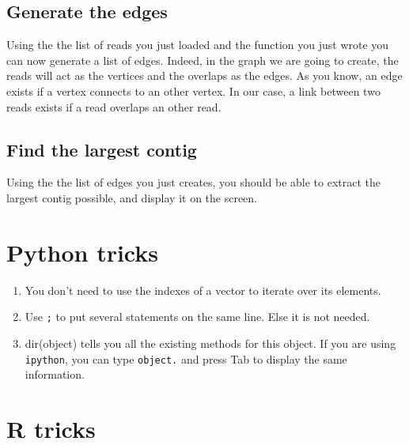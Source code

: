 \documentclass[a4paper,11pt]{article}
\begin{document}
\subsection{Generate the edges}
Using the the list of reads you just loaded and the function you just wrote you can now generate a list of edges. Indeed, in the graph we are going to create, the reads will act as the vertices and the overlaps as the edges. As you know, an edge exists if a vertex connects to an other vertex. In our case, a link between two reads exists if a read overlaps an other read.
\subsection{Find the largest contig}
Using the the list of edges you just creates, you should be able to extract the largest contig possible, and display it on the screen.

\newpage

\section{Python tricks}
\begin{enumerate}
\item You don't need to use the indexes of a vector to iterate over its elements.
\item Use \texttt{;} to put several statements on the same line. Else it is not needed.
\item dir(object) tells you all the existing methods for this object. If you are using
\texttt{ipython}, you can type \texttt{object.} and press Tab to display the same information.
\end{enumerate}

\section{R tricks}
\end{document}

